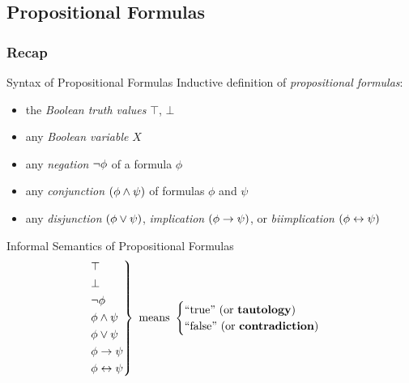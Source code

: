 \subsection{Propositional Formulas}

\subsubsection*{Recap}

\begin{frame}{\myframetitle}
	\begin{mycolumns}
		\begin{definition}{Syntax of Propositional Formulas}
			Inductive definition of \emph{propositional formulas}:
			\begin{itemize}
				\item the \emph{Boolean truth values} $\top$, $\bot$
				\item any \emph{Boolean variable} $X$
    			\item any \emph{negation} $\neg \phi$ of a formula $\phi$
    			\item any \emph{conjunction} $(\phi \wedge \psi)$ of formulas $\phi$ and $\psi$
				\item any \emph{disjunction} $(\phi \vee \psi)$, \emph{implication} $(\phi \rightarrow \psi)$, or \emph{biimplication} $(\phi \leftrightarrow \psi)$
			\end{itemize}
		\end{definition}
	\mynextcolumn
		\begin{definition}{Informal Semantics of Propositional Formulas}
			\vspace*{-4ex}
			\begin{equation*}
				\begin{rcases}
					\top                \\
					\bot                \\
					\neg \phi          \\
					\phi \wedge \psi     \\
					\phi \vee \psi      \\
					\phi \rightarrow \psi \\
					\phi \leftrightarrow \psi
				\end{rcases} \text{ means } \begin{cases}
					\text{``true'' (or {\color{black}\textbf{tautology}})} \\
					\text{``false'' (or {\color{black}\textbf{contradiction}})} \\

\end{cases}
\end{equation*}
\end{definition}
\end{mycolumns}
\end{frame}
